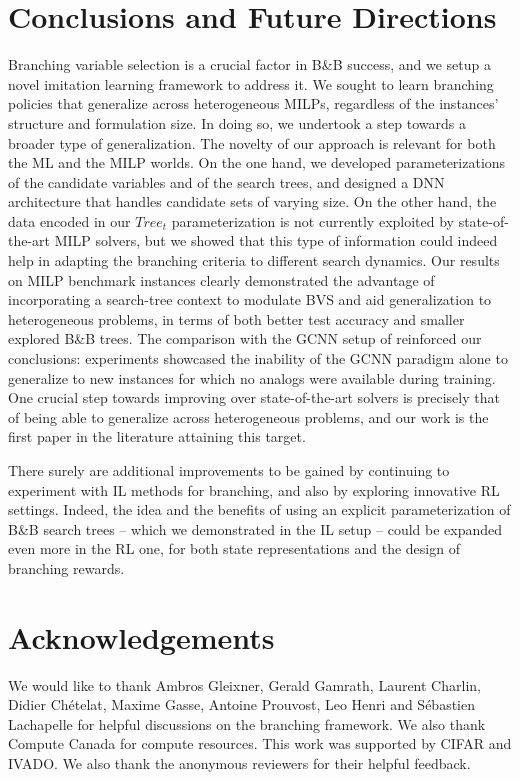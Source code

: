 \documentclass[letterpaper]{article} %
\begin{document}
\section{Conclusions and Future Directions}
\label{sec:conclusions}

Branching variable selection is a crucial factor in B\&B success, and we setup a novel imitation learning framework to address it.
We sought to learn branching policies that generalize across heterogeneous MILPs, regardless of the instances' structure and formulation size.
In doing so, we undertook a step towards a broader type of generalization.
The novelty of our approach is relevant for both the ML and the MILP worlds.
On the one hand, we developed parameterizations of the candidate variables and of the search trees, and designed a DNN architecture that handles candidate sets of varying size.
On the other hand, the data encoded in our $\mathit{Tree}_t$ parameterization is not currently exploited by state-of-the-art MILP solvers, but we showed that this type of information could indeed help in adapting the branching criteria to different search dynamics.
Our results on MILP benchmark instances clearly demonstrated the advantage of incorporating a search-tree context to modulate BVS and aid generalization to heterogeneous problems, in terms of both better test accuracy and smaller explored B\&B trees.
The comparison with the GCNN setup of \citeauthor{NIPS2019_9690} reinforced our conclusions: experiments showcased the inability of the GCNN paradigm alone to generalize to new instances for which no analogs were available during training.
One crucial step towards improving over state-of-the-art solvers is precisely that of being able to generalize across heterogeneous problems, and our work is the first paper in the literature attaining this target.

There surely are additional improvements to be gained by continuing to experiment with IL methods for branching, and also by exploring innovative RL settings.
Indeed, the idea and the benefits of using an explicit parameterization of B\&B search trees -- which we demonstrated in the IL setup -- could be expanded even more in the RL one, for both state representations and the design of branching rewards.

\section*{Acknowledgements}
We would like to thank Ambros Gleixner, Gerald Gamrath, Laurent Charlin, Didier Chételat, Maxime Gasse, Antoine Prouvost, Leo Henri and Sébastien Lachapelle for helpful discussions on the branching framework. We also thank Compute Canada for compute resources. This work was supported by CIFAR and IVADO. We also thank the anonymous reviewers for their helpful feedback.
\end{document}
